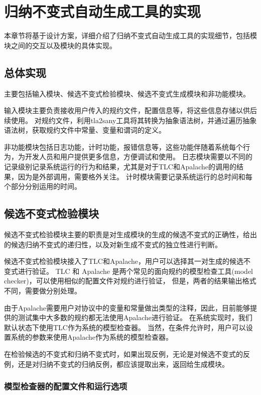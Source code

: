 \chapter{归纳不变式自动生成工具的实现}\label{chap:implementation}

本章节将基于设计方案，详细介绍了归纳不变式自动生成工具的实现细节，包括模块之间的交互以及模块的具体实现。

\section{总体实现}
主要包括输入模块、候选不变式检验模块、候选不变式生成模块和非功能模块。

输入模块主要负责接收用户传入的\TLA 规约文件，配置信息等，将这些信息存储以供后续使用。
对\TLA 规约文件，利用tla2sany工具将其转换为抽象语法树，并通过遍历抽象语法树，获取规约文件中常量、变量和谓词的定义。

非功能模块包括日志功能，计时功能，报错信息等，这些功能伴随着系统每个行为，为开发人员和用户提供更多信息，方便调试和使用。
日志模块需要以不同的记录级别记录系统运行的行为和结果，尤其是对于TLC和Apalache的调用的结果，因为是外部调用，需要格外关注。
计时模块需要记录系统运行的总时间和每个部分分别运用的时间。

\section{候选不变式检验模块}

候选不变式检验模块主要的职责是对生成模块的生成的候选不变式的正确性，给出的候选归纳不变式的递归性，以及对新生成不变式的独立性进行判断。

候选不变式检验模块接入了TLC和Apalache，用户可以选择其一对生成的候选不变式进行验证。
TLC 和 Apalache 是两个常见的面向\TLA 规约的模型检查工具(model checker)，可以使用相似的配置文件对规约进行验证，
但是，两者的结果输出格式不同，需要做分别处理。

由于Apalache需要用户对协议中的变量和常量做出类型的注释，因此，目前能够提供的测试集中大多数的规约都无法使用Apalache进行验证。
在系统实现时，我们默认状态下使用TLC作为系统的模型检查器。
当然，在条件允许时，用户可以设置系统的参数来使用Apalache作为系统的模型检查器。

在检验候选的不变式和归纳不变式时，如果出现反例，无论是对候选不变式的反例，还是对归纳不变式的归纳反例，都应该提取出来，返回给生成模块。

\subsection{模型检查器的配置文件和运行选项}

